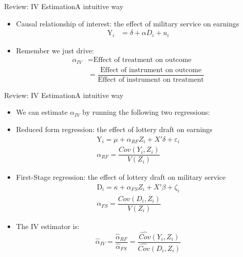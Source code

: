 \documentclass[dvipsnames,hyperref={pdfpagelabels=false}]{beamer}
\begin{document}
\begin{frame}{Review: IV Estimation}{A intuitive way}
	\begin{itemize} 
		\item Causal relationship of interest: the effect of military service on earnings
		\begin{align*}
		\mathrm{Y}_i &= \delta + \alpha D_i + u_i	
		\end{align*}
		\item Remember we just drive:
		\begin{equation*}
		\begin{aligned}
		\alpha_{IV} &= \text{Effect of treatment on outcome} \\ 
		&= \dfrac{\text{Effect of instrument on outcome}}{\text{Effect of instrument on treatment}}
		\end{aligned}
		\end{equation*}
		
	\end{itemize}
\end{frame}



\begin{frame}{Review: IV Estimation}{A intuitive way}
	\begin{itemize} 
		
		\item We can estimate $\alpha_{IV}$ by running the following two regressions:
		\vspace{0.2cm}
		\item Reduced form regression: the effect of lottery draft on earnings
		\begin{equation*}
		\begin{aligned}
		\mathrm{Y}_i =\mu+\alpha_{RF} Z_i+X'\delta+\varepsilon_i  \\
		\alpha_{RF}=\dfrac{Cov(Y_{i},Z_{i})}{V(Z_{i})}
		\end{aligned}
		\end{equation*}
		\item First-Stage regression: the effect of lottery draft on military service
		\begin{equation*}
		\begin{aligned}
		\mathrm{D}_i=\kappa + \alpha_{FS} Z_i+X'\beta + \zeta_i  \\
		\alpha_{FS}=\dfrac{Cov(D_{i},Z_{i})}{V(Z_{i})}
		\end{aligned}
		\end{equation*}
		\item The IV estimator is:
		\begin{equation*}
		\hat{\alpha}_{IV} = \dfrac{\hat{\alpha}_{RF}}{\hat{\alpha}_{FS}}=\dfrac{\hat{Cov}(Y_{i},Z_{i})}{\hat{Cov}(D_{i},Z_{i})}
		\end{equation*}
	\end{itemize}
\end{frame}
\end{document}
